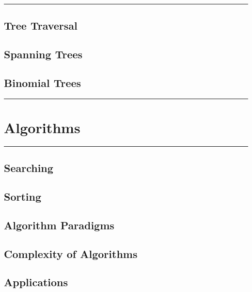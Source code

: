 \documentclass[]{book}
\begin{document}
\begin{center}\rule{0.5\linewidth}{\linethickness}\end{center}

\section{Tree Traversal}\label{tree-traversal}

\section{Spanning Trees}\label{spanning-trees}

\section{Binomial Trees}\label{binomial-trees}

\begin{center}\rule{0.5\linewidth}{\linethickness}\end{center}

\chapter{Algorithms}\label{algorithms}

\begin{center}\rule{0.5\linewidth}{\linethickness}\end{center}

\section{Searching}\label{searching}

\section{Sorting}\label{sorting}

\section{Algorithm Paradigms}\label{algorithm-paradigms}

\section{Complexity of Algorithms}\label{complexity-of-algorithms}

\section{Applications}\label{applications}
\end{document}
